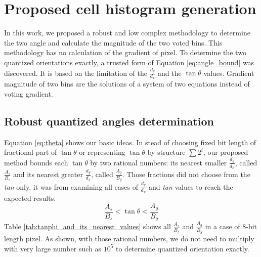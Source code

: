 %
%
\section{Proposed cell histogram generation}
\label{sec:proposed_non_normalize_feature_extraction}
In this work, we proposed a robust and low complex methodology to determine the
two  angle and calculate the magnitude of the two voted bins.
This methodology has no calculation of the gradient of pixel.
To determine the two quantized orientations exactly, a trusted form of Equation \ref{eq:angle_bound}
was discovered.
It is based on the limitation of the $\frac{d_y}{d_x}$ and  the $\tan\theta$ values.
Gradient magnitude of two bins are the solutions of a system
of two equations instead of voting gradient.

\subsection{Robust quantized angles determination}
\label{sub:robust_quantized_angles_detection}

Equation \ref{eq:theta} shows our basic ideas. 
In stead of choosing fixed bit length of fractional part of $\tan\theta$ or
representing $\tan\theta$ by structure $\sum{2^{i}}$, our proposed method
bounds each $\tan\theta$ by two rational numbers: its nearest smaller $\frac{d_y}{d_x}$, called
$\frac{A_s}{B_s}$ and its nearest greater  $\frac{d_y}{d_x}$, called $\frac{A_g}{B_g}$.
Those fractions did not choose from the \textit{tan} only, it was from examining all
cases of $\frac{d_y}{d_x}$ and \textit{tan} values to reach the expected results.
\begin{equation}
	\frac{A_s}{B_s} < \tan\theta < \frac{A_g}{B_g} \label{eq:theta}
\end{equation}
Table \ref{tab:tanphi_and_its_nearest_values} shows all $\frac{A_s}{B_s}$ and
$\frac{A_g}{B_g}$ in a case  of 8-bit length pixel. 
As shown, with those rational numbers, we do not need to multiply with very
large number such as $10^5$ to determine quantized orientation exactly.

